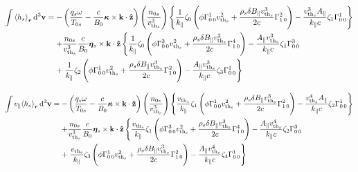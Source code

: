 \documentclass[prb,aps,amssymb,amsmath,a4paper]{revtex4}
\begin{document}
\begin{align}
\nonumber
\int {\left< h_s \right>}_{\bm{r}}\,\mathrm{d}^3\mathbf{v}= -& \left(\frac{q_s\omega}{T_{0s}} - \frac{c}{B_0} \bm{\kappa}\times\mathbf{k}\cdot\mathbf{\hat{z}}\right)\left(\frac{n_{0s}}{v_{\mathrm{th}_s}^3}\right)\left\{ \frac{1}{k_\parallel}\zeta_0\left(\phi \Gamma^{1}_{0\,0} v_{\mathrm{th}_s}^2 + \frac{\rho_s \delta B_\parallel v_{\mathrm{th}_s}^3}{2 c} \Gamma^{2}_{1\,0}\right) - \frac{v_{\mathrm{th}_s}^3 A_\parallel}{k_\parallel c} \zeta_1 \Gamma^{1}_{0\,0} \right\}
\\ \nonumber
+& \frac{n_{0s}}{v_{\mathrm{th}_s}^3} \frac{c}{B_0} \bm{\eta}_s\times\mathbf{k}\cdot\mathbf{\hat{z}}\left\{ \frac{1}{k_\parallel} \zeta_0 \left( \phi \Gamma^{3}_{0\,0} v_{\mathrm{th}_s}^2 + \frac{\rho_s \delta B_\parallel v_{\mathrm{th}_s}^3}{2 c} \Gamma^{4}_{1\,0} \right) - \frac{A_\parallel v_{\mathrm{th}_s}^3}{k_\parallel c} \zeta_1 \Gamma^{3}_{0\,0}\right. \\
		\nonumber +& \left. \frac{1}{k_\parallel} \zeta_2 \left(\phi \Gamma^{1}_{0\,0} v_{\mathrm{th}_s}^2 + \frac{\rho_s \delta B_\parallel v_{\mathrm{th}_s}^3}{2 c} \Gamma^{2}_{1\,0} \right) - \frac{A_\parallel v_{\mathrm{th}_s}^3}{k_\parallel c} \zeta_3\Gamma^{1}_{0\,0}\right\}
\end{align}

\begin{align}
\nonumber
\int v_\parallel {\left< h_s \right>}_{\bm{r}}\,\mathrm{d}^3\mathbf{v}= -& \left(\frac{q_s\omega}{T_{0s}} - \frac{c}{B_0} \bm{\kappa}\times\mathbf{k}\cdot\mathbf{\hat{z}}\right)\left(\frac{n_{0s}}{v_{\mathrm{th}_s}^3}\right)\left\{ \frac{v_{\mathrm{th}_s}}{k_\parallel}\zeta_1\left(\phi \Gamma^{1}_{0\,0} v_{\mathrm{th}_s}^2 + \frac{\rho_s \delta B_\parallel v_{\mathrm{th}_s}^3}{2 c} \Gamma^{2}_{1\,0}\right) - \frac{v_{\mathrm{th}_s}^4 A_\parallel}{k_\parallel c} \zeta_2 \Gamma^{1}_{0\,0} \right\}
\\ \nonumber
+& \frac{n_{0s}}{v_{\mathrm{th}_s}^3} \frac{c}{B_0} \bm{\eta}_s\times\mathbf{k}\cdot\mathbf{\hat{z}}\left\{ \frac{v_{\mathrm{th}_s}}{k_\parallel} \zeta_1 \left( \phi \Gamma^{3}_{0\,0} v_{\mathrm{th}_s}^2 + \frac{\rho_s \delta B_\parallel v_{\mathrm{th}_s}^3}{2 c} \Gamma^{4}_{1\,0} \right) - \frac{A_\parallel v_{\mathrm{th}_s}^4}{k_\parallel c} \zeta_2 \Gamma^{3}_{0\,0}\right. \\
		\nonumber +& \left. \frac{v_{\mathrm{th}_s}}{k_\parallel} \zeta_3 \left(\phi \Gamma^{1}_{0\,0} v_{\mathrm{th}_s}^2 + \frac{\rho_s \delta B_\parallel v_{\mathrm{th}_s}^3}{2 c} \Gamma^{2}_{1\,0} \right) - \frac{A_\parallel v_{\mathrm{th}_s}^4}{k_\parallel c} \zeta_4\Gamma^{1}_{0\,0}\right\}
\end{align}
\end{document}
